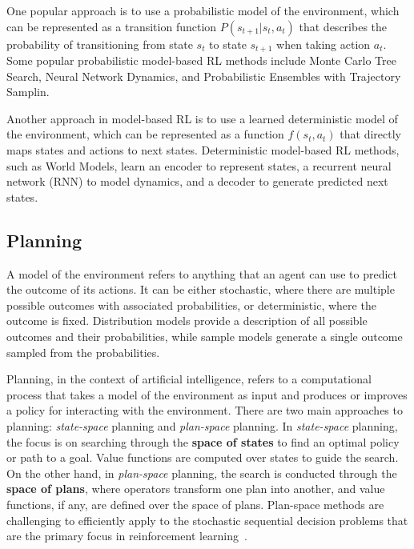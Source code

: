 \documentclass[../chapters.tex]{subfiles}
\begin{document}
    One popular approach is to use a probabilistic model of the environment, which can be represented as a transition function $P(s_{t+1}|s_t, a_t)$ that describes the probability of transitioning from state $s_t$ to state $s_{t+1}$ when taking action $a_t$.
    Some popular probabilistic model-based RL methods include Monte Carlo Tree Search, Neural Network Dynamics, and Probabilistic Ensembles with Trajectory Samplin.

    Another approach in model-based RL is to use a learned deterministic model of the environment, which can be represented as a function $f(s_t, a_t)$ that directly maps states and actions to next states.
    Deterministic model-based RL methods, such as World Models, learn an encoder to represent states, a recurrent neural network (RNN) to model dynamics, and a decoder to generate predicted next states.

    \subsection{Planning}\label{subsec:planning}
    A model of the environment refers to anything that an agent can use to predict the outcome of its actions.
    It can be either stochastic, where there are multiple possible outcomes with associated probabilities, or deterministic, where the outcome is fixed.
    Distribution models provide a description of all possible outcomes and their probabilities, while sample models generate a single outcome sampled from the probabilities.

    Planning, in the context of artificial intelligence, refers to a computational process that takes a model of the environment as input and produces or improves a policy for interacting with the environment.
    There are two main approaches to planning: \emph{state-space} planning and \emph{plan-space} planning.
    In \emph{state-space} planning, the focus is on searching through the \textbf{space of states} to find an optimal policy or path to a goal.
    Value functions are computed over states to guide the search.
    On the other hand, in \emph{plan-space} planning, the search is conducted through the \textbf{space of plans}, where operators transform one plan into another, and value functions, if any, are defined over the space of plans.
    Plan-space methods are challenging to efficiently apply to the stochastic sequential decision problems that are the primary focus in reinforcement learning~\cite{sutton2018reinforcement}.
\end{document}
